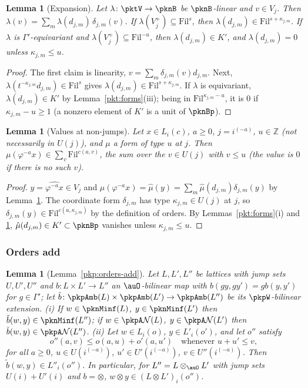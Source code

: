 \documentclass[10pt]{amsart}
\newtheorem{lemma}[theorem]{Lemma}
\theoremstyle{definition}
\theoremstyle{remark}
\newcommand{\Z}{\mathbb Z}
\begin{document}
\begin{lemma}[Expansion]\label{pkt:expand}
Let $\lambda\colon\pktV\to\pknB$ be $\pknB$-linear and $v\in V_j$. Then
$\lambda(v)=\sum_m\lambda(d_{j,m})\,\delta_{j,m}(v)$. If $\lambda(V_j^+)\subseteq\mathrm{Fil}^{s}$, then
$\lambda(d_{j,m})\in\mathrm{Fil}^{s+\kappa_{j,m}}$. If $\lambda$ is $\Gamma'$-equivariant and $\lambda(V_j^+)
\subseteq\mathrm{Fil}^{-u}$, then $\lambda(d_{j,m})\in K'$, and $\lambda(d_{j,m})=0$ unless $\kappa_{j,m}\le u$.
\end{lemma}

\begin{proof}
The first claim is linearity, $v=\sum_m\delta_{j,m}(v)d_{j,m}$. Next, $\lambda(t^{-\kappa_{j,m}}d_{j,m})\in
\mathrm{Fil}^s$ gives $\lambda(d_{j,m})\in\mathrm{Fil}^{s+\kappa_{j,m}}$. If $\lambda$ is equivariant,
$\lambda(d_{j,m})\in K'$ by Lemma~\ref{pkt:forms}(iii); being in $\mathrm{Fil}^{\kappa_{j,m}-u}$, it is $0$ if
$\kappa_{j,m}-u\ge1$ (a nonzero element of $K'$ is a unit of $\pknBp$).
\end{proof}

\begin{lemma}[Values at non-jumps]\label{pkt:gap}
Let $x\in L_i(c)$, $a\ge0$, $j=i^{(-a)}$, $u\in\Z$ (not necessarily in $U(j)$), and $\mu$ a form of type
$u$ at $j$. Then $\mu(\varphi^{-a}x)\in\sum_{v}\mathrm{Fil}^{c(a,v)}$, the sum over the $v\in U(j)$ with
$v\le u$ (the value is $0$ if there is no such $v$).
\end{lemma}

\begin{proof}
$y=\widehat{\varphi^{-a}x}\in V_j$ and $\mu(\varphi^{-a}x)=\hat\mu(y)=\sum_m\hat\mu(d_{j,m})\delta_{j,m}(y)$ by
Lemma~\ref{pkt:expand}. The coordinate form $\delta_{j,m}$ has type $\kappa_{j,m}\in U(j)$ at $j$, so
$\delta_{j,m}(y)\in\mathrm{Fil}^{c(a,\kappa_{j,m})}$ by the definition of orders. By
Lemmas~\ref{pkt:forms}(i) and \ref{pkt:expand}, $\hat\mu(d_{j,m})\in K'\subset\pknBp$ vanishes unless
$\kappa_{j,m}\le u$.
\end{proof}

\subsubsection{Orders add}\label{pkt:ss-add}

\begin{lemma}[Lemma~\ref{pkp:orders-add}]\label{pkt:add}
Let $L,L',L''$ be lattices with jump sets $U,U',U''$ and $b\colon L\times L'\to L''$ an $\auO$-bilinear
map with $b(gy,gy')=gb(y,y')$ for $g\in\Gamma'$; let $\tilde b\colon\pkpAmb(L)\times\pkpAmb(L')\to
\pkpAmb(L'')$ be its $\pkpW$-bilinear extension. (i) If $w\in\pknMinf(L)$, $y\in\pknMinf(L')$ then
$\tilde b(w,y)\in\pknMinf(L'')$; if $w\in\pkpA\mathcal N(L)$, $y\in\pkpA\mathcal N(L')$ then
$\tilde b(w,y)\in\pkpA\mathcal N(L'')$. (ii) Let $w\in L_i(o)$, $y\in L'_i(o')$, and let $o''$ satisfy
\[
o''(a,v)\le o(a,u)+o'(a,u')\quad\text{whenever }u+u'\le v,
\]
for all $a\ge0$, $u\in U(i^{(-a)})$, $u'\in U'(i^{(-a)})$, $v\in U''(i^{(-a)})$. Then $\tilde b(w,y)\in
L''_i(o'')$. In particular, for $L''=L\otimes_\auO L'$ with jump sets $U(i)+U'(i)$ and $b=\otimes$, $w\otimes
y\in(L\otimes L')_i(o'')$.
\end{lemma}
\end{document}

